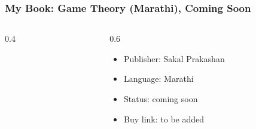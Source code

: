 
\begin{frame}[fragile]\frametitle{My Book: Game Theory (Marathi), Coming Soon}
\begin{columns}
    \begin{column}[T]{0.4\linewidth}
		\begin{center}
		\end{center}
    \end{column}
    \begin{column}[T]{0.6\linewidth}
		\begin{itemize}
		\item Publisher: Sakal Prakashan
		\item Language: Marathi
		\item Status: coming soon
		\item Buy link: to be added
		\end{itemize}
		\begin{center}
		\end{center}
    \end{column}
\end{columns}
\end{frame}
